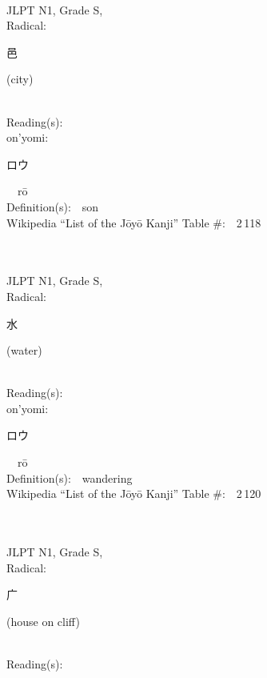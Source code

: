 \begin{multicols}{2}
{\fontsize{34pt}{40pt}  }\ \ \\
{JLPT N1, Grade S, \\Radical:\ \ {\begin{CJK}{UTF8}{min} 邑 \end{CJK}} (city) } \\
Reading(s):\ \ \\
{\hspace*{1em}}on'yomi:\ \ \\
{\hspace*{2em}}{\begin{CJK}{UTF8}{min} ロウ \end{CJK}}\ \ r\=o\ \ \\
Definition(s):\ \ son \\
Wikipedia ``List of the J\=oy\=o Kanji'' Table \#:\ \ 2\,118 \\
\ \ \\
{\fontsize{34pt}{40pt}  }\ \ \\
{JLPT N1, Grade S, \\Radical:\ \ {\begin{CJK}{UTF8}{min} 水 \end{CJK}} (water) } \\
Reading(s):\ \ \\
{\hspace*{1em}}on'yomi:\ \ \\
{\hspace*{2em}}{\begin{CJK}{UTF8}{min} ロウ \end{CJK}}\ \ r\=o\ \ \\
Definition(s):\ \ wandering \\
Wikipedia ``List of the J\=oy\=o Kanji'' Table \#:\ \ 2\,120 \\
\ \ \\
{\fontsize{34pt}{40pt}  }\ \ \\
{JLPT N1, Grade S, \\Radical:\ \ {\begin{CJK}{UTF8}{min} 广 \end{CJK}} (house on cliff) } \\
Reading(s):\ \ \\

\end{multicols}
